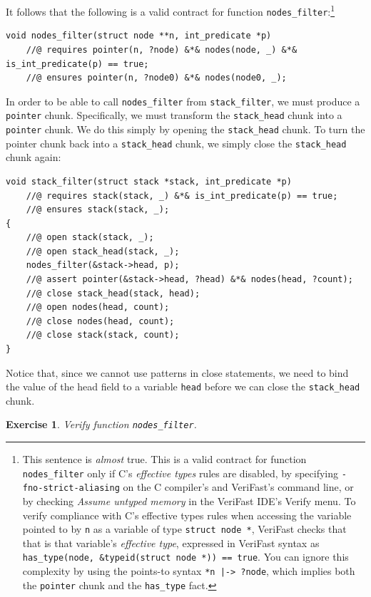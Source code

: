 \documentclass{article}
\newtheorem{exercise}{Exercise}
\begin{document}
It follows that the following is a valid contract for function
\lstinline!nodes_filter!:\footnote{This sentence is \emph{almost} true. This is a valid contract for function \lstinline!nodes_filter! only if C's \emph{effective types} rules are disabled, by specifying \lstinline|-fno-strict-aliasing| on the C compiler's and VeriFast's command line, or by checking \emph{Assume untyped memory} in the VeriFast IDE's Verify menu. To verify compliance with C's effective types rules when accessing the variable pointed to by \lstinline|n| as a variable of type \lstinline|struct node *|, VeriFast checks that that is that variable's \emph{effective type}, expressed in VeriFast syntax as \lstinline|has_type(node, &typeid(struct node *)) == true|. You can ignore this complexity by using the points-to syntax \lstinline!*n |-> ?node!, which implies both the \lstinline|pointer| chunk and the \lstinline|has_type| fact.}
\begin{lstlisting}
void nodes_filter(struct node **n, int_predicate *p)
    //@ requires pointer(n, ?node) &*& nodes(node, _) &*& is_int_predicate(p) == true;
    //@ ensures pointer(n, ?node0) &*& nodes(node0, _);
\end{lstlisting}

In order to be able to call \lstinline!nodes_filter! from
\lstinline!stack_filter!, we must produce a \lstinline!pointer!
chunk. Specifically, we must transform the
\lstinline!stack_head! chunk into a \lstinline!pointer! chunk.
We do this simply by opening the \lstinline!stack_head! chunk.
To turn the pointer chunk back into a \lstinline!stack_head!
chunk, we simply close the \lstinline!stack_head! chunk again:
\begin{lstlisting}
void stack_filter(struct stack *stack, int_predicate *p)
    //@ requires stack(stack, _) &*& is_int_predicate(p) == true;
    //@ ensures stack(stack, _);
{
    //@ open stack(stack, _);
    //@ open stack_head(stack, _);
    nodes_filter(&stack->head, p);
    //@ assert pointer(&stack->head, ?head) &*& nodes(head, ?count);
    //@ close stack_head(stack, head);
    //@ open nodes(head, count);
    //@ close nodes(head, count);
    //@ close stack(stack, count);
}
\end{lstlisting}
Notice that, since we cannot use patterns in close statements,
we need to bind the value of the head field to a variable
\lstinline!head! before we can close the \lstinline!stack_head!
chunk.

\begin{exercise}\label{exercise:byref}
Verify function \lstinline!nodes_filter!.
\end{exercise}
\end{document}
